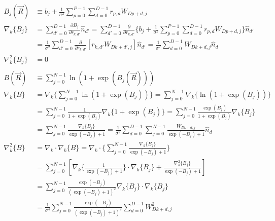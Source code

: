 \documentclass[12pt]{article}
\begin{document}
\begin{align*}
B_j(\vec{R}) &\equiv b_j + \frac{1}{\sigma^2} \sum_{p=0}^{P-1}\sum_{d=0}^{D-1} r_{p,d} W_{Dp+d,j}\\
\nabla_k \{ B_j \}  &= \sum_{d'=0}^{D-1} \frac{\partial B_j}{\partial r_{k,d'}} \hat{n}_{d'} = \sum_{d'=0}^{D-1} \frac{\partial}{\partial r_{k,d'}} \bigg\{ b_j + \frac{1}{\sigma^2} \sum_{p=0}^{P-1}\sum_{d=0}^{D-1} r_{p,d} W_{Dp+d,j} \bigg\} \hat{n}_{d'}\\
&= \frac{1}{\sigma^2} \sum_{d'=0}^{D-1} \frac{\partial}{\partial r_{k,d'}} \left[ r_{k,d'} W_{Dk+d',j} \right] \hat{n}_{d'} = \frac{1}{\sigma^2} \sum_{d=0}^{D-1} W_{Dk+d,j} \hat{n}_d \\
\nabla_k^2 \{ B_j \} &= 0\\ \\
B(\vec{R}) &\equiv \sum_{j=0}^{N-1} \ln \left(  1 + \exp \left( B_j (\vec{R}) \right) \right)\\
\nabla_k \{ B \} &= \nabla_k \bigg\{ \sum_{j=0}^{N-1} \ln \left(  1 + \exp \left( B_j \right) \right) \bigg\}= \sum_{j=0}^{N-1}\nabla_k \bigg\{  \ln \left(  1 + \exp \left( B_j \right) \right) \bigg\} \\
&=\sum_{j=0}^{N-1} \frac{1}{1+\exp(B_j)} \nabla_k \Big\{ 1+\exp(B_j) \Big\} 
=\sum_{j=0}^{N-1} \frac{\exp(B_j)}{1+\exp(B_j)} \nabla_k \{ B_j \}\\
&=\sum_{j=0}^{N-1} \frac{\nabla_k \{ B_j \}}{\exp(-B_j)+1}  = \frac{1}{\sigma^2} \sum_{d=0}^{D-1} \sum_{j=0}^{N-1}  \frac{W_{Dk+d,j}}{\exp(-B_j)+1}   \hat{n}_d \\
\nabla_k^2 \{ B\} &= \nabla_k \cdot \nabla_k \{ B \} = \nabla_k \cdot \bigg\{  \sum_{j=0}^{N-1} \frac{\nabla_k \{ B_j \}}{\exp(-B_j)+1}  \bigg\}\\
&= \sum_{j=0}^{N-1} \left[ \nabla_k \Big\{ \frac{1}{\exp(-B_j)+1} \Big\} \cdot \nabla_k \{ B_j \} + \frac{\nabla_k^2 \{ B_j \}}{\exp(-B_j)+1} \right]\\
&= \sum_{j=0}^{N-1} \frac{\exp(-B_j)}{(\exp(-B_j)+1)^2} \nabla_k \{ B_j \} \cdot \nabla_k \{ B_j \}\\
&= \frac{1}{\sigma^4} \sum_{j=0}^{N-1} \frac{\exp(-B_j)}{(\exp(-B_j)+1)^2} \sum_{d=0}^{D-1} W_{Dk+d,j}^2
\end{align*}
\end{document}
